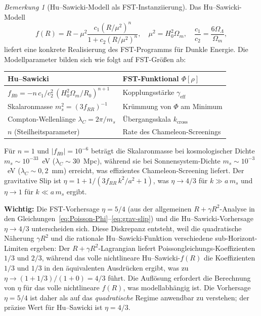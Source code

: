 \documentclass[12pt,a4paper]{article}
\theoremstyle{definition}
\theoremstyle{plain}
\theoremstyle{remark}
\newtheorem{remark}[definition]{Bemerkung}
\begin{document}
\begin{remark}[Hu--Sawicki-Modell als FST-Instanziierung]
\label{rem:hu-sawicki-fst}
Das Hu--Sawicki-Modell~\cite{HuSawicki2007}
\[
f(R) = R - \mu^2 \frac{c_1 (R/\mu^2)^n}{1 + c_2 (R/\mu^2)^n}, \quad \mu^2 = H_0^2 \Omega_m, \quad \frac{c_1}{c_2} = \frac{6\Omega_\Lambda}{\Omega_m},
\]
liefert eine konkrete Realisierung des FST-Programms f\"ur Dunkle Energie. Die Modellparameter bilden sich wie folgt auf FST-Gr\"o\ss en ab:
\begin{center}
\begin{tabular}{l|l}
\textbf{Hu--Sawicki} & \textbf{FST-Funktional $\Phi[\rho]$} \\
\hline
$f_{R0} = -n\, c_1 / c_2^2\, (H_0^2 \Omega_m / R_0)^{n+1}$ & Kopplungsst\"arke $\gamma_{\mathrm{eff}}$ \\
Skalaronmasse $m_s^2 = (3 f_{RR})^{-1}$ & Kr\"ummung von $\Phi$ am Minimum \\
Compton-Wellenl\"ange $\lambda_C = 2\pi/m_s$ & \"Ubergangsskala $k_{\mathrm{cross}}$ \\
$n$ (Steilheitsparameter) & Rate des Chameleon-Screenings \\
\end{tabular}
\end{center}
F\"ur $n = 1$ und $|f_{R0}| = 10^{-6}$ betr\"agt die Skalaronmasse bei kosmologischer Dichte $m_s \sim 10^{-33}$~eV ($\lambda_C \sim 30$~Mpc), w\"ahrend sie bei Sonnensystem-Dichte $m_s \sim 10^{-3}$~eV ($\lambda_C \sim 0{,}2$~mm) erreicht, was effizientes Chameleon-Screening liefert. Der gravitative Slip ist $\eta = 1 + 1/(3 f_{RR}\, k^2/a^2 + 1)$, was $\eta \to 4/3$ f\"ur $k \gg a\,m_s$ und $\eta \to 1$ f\"ur $k \ll a\,m_s$ ergibt.

\textbf{Wichtig:} Die FST-Vorhersage $\eta = 5/4$ (aus der allgemeinen $R + \gamma R^{2}$-Analyse in den Gleichungen~\eqref{eq:Poisson-Phi}--\eqref{eq:grav-slip}) und die Hu--Sawicki-Vorhersage $\eta \to 4/3$ unterscheiden sich. Diese Diskrepanz entsteht, weil die quadratische N\"aherung $\gamma R^2$ und die rationale Hu--Sawicki-Funktion verschiedene sub-Horizont-Limiten ergeben: Der $R + \gamma R^2$-Lagrangian liefert Poissongleichungs-Koeffizienten $1/3$ und $2/3$, w\"ahrend das volle nichtlineare Hu--Sawicki-$f(R)$ die Koeffizienten $1/3$ und $1/3$ in den \"aquivalenten Ausdr\"ucken ergibt, was zu $\eta \to (1 + 1/3)/(1 + 0) = 4/3$ f\"uhrt. Die Aufl\"osung erfordert die Berechnung von $\eta$ f\"ur das volle nichtlineare $f(R)$, was modellabh\"angig ist. Die Vorhersage $\eta = 5/4$ ist daher als auf das \emph{quadratische} Regime anwendbar zu verstehen; der pr\"azise Wert f\"ur Hu--Sawicki ist $\eta = 4/3$.
\end{remark}
\end{document}
